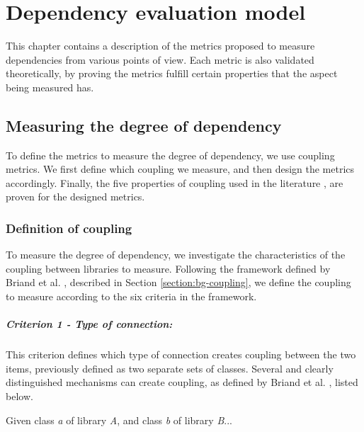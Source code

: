 \chapter{Dependency evaluation model}\label{ch:TheoreticModel}
This chapter contains a description of the metrics proposed to measure dependencies from various points of view. Each metric is also validated theoretically, by proving the metrics fulfill certain properties that the aspect being measured has.

\section{Measuring the degree of dependency}\label{sect:degree-dependency}
To define the metrics to measure the degree of dependency, we use coupling metrics. We first define which coupling we measure, and then design the metrics accordingly. Finally, the five properties of coupling used in the literature \cite{briand1996property}, are proven for the designed metrics.

\subsection{Definition of coupling}\label{subsect:defCoupling}
To measure the degree of dependency, we investigate the characteristics of the coupling between libraries to measure. Following the framework defined by Briand et al. \cite{briand1999unified}, described in Section \ref{section:bg-coupling}, we define the coupling to measure according to the six criteria in the framework.

\paragraph{Criterion 1 - Type of connection:}
This criterion defines which type of connection creates coupling between the two items, previously defined as two separate sets of classes. Several and clearly distinguished mechanisms can create coupling, as defined by Briand et al. \cite{briand1999unified}, listed below.

\blankls
Given class \textit{a} of library \textit{A}, and class \textit{b} of library \textit{B}...

